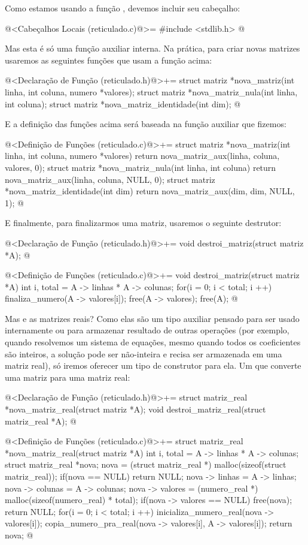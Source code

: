 Como estamos usando a função , devemos incluir seu
cabeçalho:

\iniciocodigo
@<Cabeçalhos Locais (reticulado.c)@>=
#include <stdlib.h>
@
\fimcodigo

Mas esta é só uma função auxiliar interna. Na prática, para criar
novas matrizes usaremos as seguintes funções que usam a função acima:

\iniciocodigo
@<Declaração de Função (reticulado.h)@>+=
struct matriz *nova_matriz(int linha, int coluna, numero *valores);
struct matriz *nova_matriz_nula(int linha, int coluna);
struct matriz *nova_matriz_identidade(int dim);
@
\fimcodigo

E a definição das funções acima será baseada na função auxiliar que
fizemos:

\iniciocodigo
@<Definição de Funções (reticulado.c)@>+=
struct matriz *nova_matriz(int linha, int coluna, numero *valores){
  return nova_matriz_aux(linha, coluna, valores, 0);
}
struct matriz *nova_matriz_nula(int linha, int coluna){
  return nova_matriz_aux(linha, coluna, NULL, 0);
}
struct matriz *nova_matriz_identidade(int dim){
  return nova_matriz_aux(dim, dim, NULL, 1);
}
@
\fimcodigo

E finalmente, para finalizarmos uma matriz, usaremos o seguinte
destrutor:

\iniciocodigo
@<Declaração de Função (reticulado.h)@>+=
void destroi_matriz(struct matriz *A);
@
\fimcodigo

\iniciocodigo
@<Definição de Funções (reticulado.c)@>+=
void destroi_matriz(struct matriz *A){
  int i, total = A -> linhas * A -> colunas;
  for(i = 0; i < total; i ++){
    finaliza_numero(A -> valores[i]);
  }
  free(A -> valores);
  free(A);
}
@
\fimcodigo

Mas e as matrizes reais? Como elas são um tipo auxiliar pensado para
ser usado internamente ou para armazenar resultado de outras operações
(por exemplo, quando resolvemos um sistema de equações, mesmo quando
todos os coeficientes são inteiros, a solução pode ser não-inteira e
recisa ser armazenada em uma matriz real), só iremos oferecer um tipo
de construtor para ela. Um que converte uma matriz para uma matriz
real:

\iniciocodigo
@<Declaração de Função (reticulado.h)@>+=
struct matriz_real *nova_matriz_real(struct matriz *A);
void destroi_matriz_real(struct matriz_real *A);
@
\fimcodigo

\iniciocodigo
@<Definição de Funções (reticulado.c)@>+=
struct matriz_real *nova_matriz_real(struct matriz *A){
  int i, total = A -> linhas * A -> colunas;
  struct matriz_real *nova;
  nova = (struct matriz_real *) malloc(sizeof(struct matriz_real));
  if(nova == NULL)
    return NULL;
  nova -> linhas = A -> linhas;
  nova -> colunas = A -> colunas;
  nova -> valores = (numero_real *) malloc(sizeof(numero_real) * total);
  if(nova -> valores == NULL){
    free(nova);
    return NULL;
  }
  for(i = 0; i < total; i ++){
    inicializa_numero_real(nova -> valores[i]);
    copia_numero_pra_real(nova -> valores[i], A -> valores[i]);
  }
  return nova;
}
@
\fimcodigo

